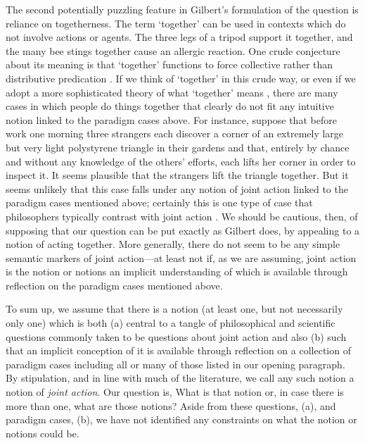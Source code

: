 \documentclass[12pt,a4paper]{extarticle}
\begin{document}
The second potentially puzzling feature in Gilbert's formulation of the question is reliance on togetherness.
The term `together' can be used in contexts which do not involve actions or agents.
The three legs of a tripod support it together,
and the many bee stings together cause an allergic reaction.
One crude conjecture about its meaning is that `together' functions to force collective rather than distributive predication \citep[on collective and distributive, see][p.\ 322]{oliver_modest_2006}.
If we think of `together' in this crude way, 
or even if we adopt a more sophisticated theory of what `together' means  \citep[e.g.][]{moltmann_semantics_2004},
there are many cases in which people do things together that clearly do not fit any intuitive notion linked to the paradigm cases above.
For instance, suppose that before work one morning three strangers each discover a corner of an extremely large but very light polystyrene triangle in their gardens and that, entirely by chance and without any knowledge of the others' efforts, each lifts her corner in order to inspect it.
It seems plausible that the strangers lift the triangle together.
But it seems unlikely that this case falls under any notion of joint action linked to the paradigm cases mentioned above;
certainly this is one type of case that philosophers typically contrast with joint action \citep[e.g.][p.\ 149]{Bratman:2009lv}.
We should be cautious, then, of supposing that our question can be put exactly as Gilbert does, by appealing to a notion of acting together.
More generally, there do not seem to be any simple semantic markers of joint action---at least not if, as we are assuming, joint action is the notion or notions an implicit understanding of which is available through reflection on the paradigm cases mentioned above.

To sum up, we assume that there is a notion (at least one, but not necessarily only one) which is both 
	(a) central to a tangle of philosophical and scientific questions  commonly taken to be questions about joint action
	and also 
	(b) such that an implicit conception of it is available through reflection on a collection of paradigm cases including all or many of those listed in our opening paragraph.
By stipulation, and in line with much of the literature, we call any such notion a notion of \emph{joint action}.
Our question is, What is that notion or, in case there is more than one, what are those notions?  
Aside from these questions, (a), and paradigm cases, (b), we have not identified any constraints on what the notion or notions could be.
\end{document}
